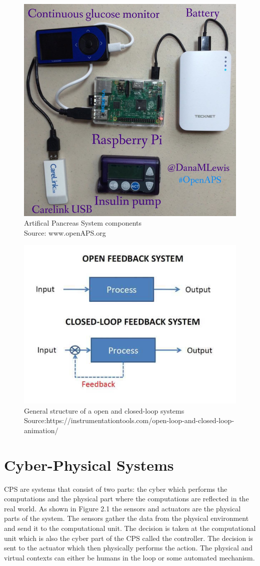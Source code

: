 \begin{figure}
	\centering
	\includegraphics[width=0.7\linewidth]{Images/APSrig}
	\caption{Artifical Pancreas System components \\
     Source: www.openAPS.org}
	\label{fig:apsrig}
\end{figure}



\begin{figure}
	\centering
	\includegraphics[width=0.7\linewidth]{Images/closedvsopen}
	\caption{General structure of a open and closed-loop systems 
	             Source:https://instrumentationtools.com/open-loop-and-closed-loop-animation/ }
	\label{fig:closedvsopen}
\end{figure}


\section{Cyber-Physical Systems}
\ac{CPS} are systems that consist of two parts: the cyber which performs the computations and the physical part where the computations are reflected in the real world.  
As shown in Figure 2.1 the sensors and actuators are the physical parts of the system. 
The sensors gather the data from the physical environment and send it to the computational unit. 
The decision is taken at the computational unit which is also the cyber part of the \ac{CPS} called the controller.
The decision is sent to the actuator which then physically performs the action.
The physical and virtual contexts can either be humans in the loop or some automated mechanism. 


